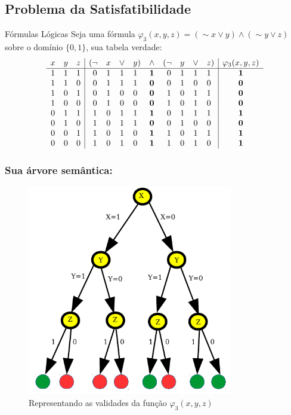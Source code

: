 \documentclass{beamer}
\begin{document}
\subsection{Problema da Satisfatibilidade}
\begin{frame}[fragile]

\begin{block}{Fórmulas Lógicas}
Seja uma fórmula $\varphi_3 (x,y,z) = (\sim x \vee y)\wedge (\sim y \vee z)$  sobre  o domínio $\{0 , 1\}$, sua  tabela verdade:
$$
\begin{array}{ccc|c@{}cccc@{}ccc@{}cccc@{}c  | c }
x&y&z&(&\lnot&x&\lor&y&)&\land&(&\lnot&y&\lor&z&) & \varphi_3 (x,y,z) \\\hline
1&1&1&&0&1&1&1&&\mathbf{1}&&0&1&1&1& & \mathbf{1}\\
1&1&0&&0&1&1&1&&\mathbf{0}&&0&1&0&0& & \mathbf{0}\\
1&0&1&&0&1&0&0&&\mathbf{0}&&1&0&1&1& & \mathbf{0}\\
1&0&0&&0&1&0&0&&\mathbf{0}&&1&0&1&0& & \mathbf{0}\\
0&1&1&&1&0&1&1&&\mathbf{1}&&0&1&1&1& & \mathbf{1}\\
0&1&0&&1&0&1&1&&\mathbf{0}&&0&1&0&0& & \mathbf{0}\\
0&0&1&&1&0&1&0&&\mathbf{1}&&1&0&1&1& & \mathbf{1}\\
0&0&0&&1&0&1&0&&\mathbf{1}&&1&0&1&0& & \mathbf{1}
\end{array}
$$


\end{block}
\end{frame}

\begin{frame}[fragile]
\frametitle{Sua árvore semântica:}

\begin{figure}[ht!]
 \centering
 \includegraphics[width=0.8\textwidth , height=0.65\textheight]{xyz_tree.pdf}
 \caption{Representando as validades da função $\varphi_3 (x,y,z)$} 
\end{figure}

\end{frame}
\end{document}

